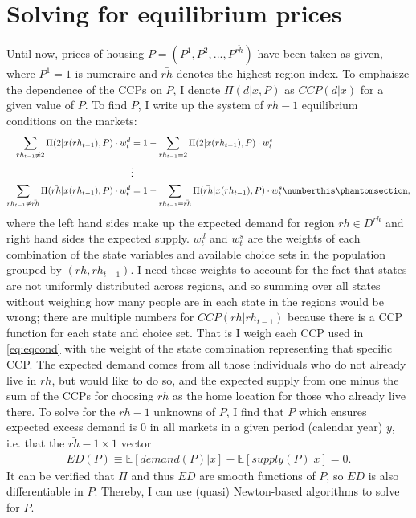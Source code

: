 \section{Solving for equilibrium prices}
Until now, prices of housing $P=(P^1,P^2,...,P^{\bar{rh}})$ have been taken as given, where $P^1=1$ is numeraire and $\bar{rh}$ denotes the highest region index. To emphaisze the dependence of the CCPs on $P$, I denote $\Pi(d|x,P)$ as $CCP(d|x)$ for a given value of $P$. To find $P$, I write up the system of $\bar{rh}-1$ equilibrium conditions on the markets:
\begin{align*}
\sum_{rh_{t-1} \neq 2}{\Pi(2|x(rh_{t-1}),P)\cdot w_t^d}&=1-\sum_{rh_{t-1} = 2}{\Pi(2|x(rh_{t-1}),P)\cdot w_t^s} \\
&\vdots \\
\sum_{rh_{t-1} \neq \bar{rh}}{\Pi(\bar{rh}|x(rh_{t-1}),P)\cdot w_t^d}&=1-\sum_{rh_{t-1} = \bar{rh}}{\Pi(\bar{rh}|x(rh_{t-1}),P)\cdot w_t^s} \numberthis \phantomsection \label{eq:eqcond},
\end{align*}
where the left hand sides make up the expected demand for region $rh\in D^{rh}$ and right hand sides the expected supply. $w_t^d$ and $w_t^s$ are the weights of each combination of the state variables and available choice sets in the population grouped by $(rh,rh_{t-1})$. I need these weights to account for the fact that states are not uniformly distributed across regions, and so summing over all states without weighing how many people are in each state in the regions would be wrong; there are multiple numbers for $CCP(rh|rh_{t-1})$ because there is a CCP function for each state and choice set. That is I weigh each CCP used in \eqref{eq:eqcond} with the weight of the state combination representing that specific CCP. The expected demand comes from all those individuals who do not already live in $rh$, but would like to do so, and the expected supply from one minus the sum of the CCPs for choosing $rh$ as the home location for those who already live there. To solve for the $\bar{rh}-1$ unknowns of $P$, I find that $P$ which ensures expected excess demand is 0 in all markets in a given period (calendar year) $y$, i.e. that the $\bar{rh}-1\times 1$ vector
\begin{align*}
ED(P)\equiv \mathbb{E}[demand(P)|x]-\mathbb{E}[supply(P)|x]=0.
\end{align*}
It can be verified that $\Pi$ and thus $ED$ are smooth functions of $P$, so $ED$ is also differentiable in $P$. Thereby, I can use (quasi) Newton-based algorithms to solve for $P$.

